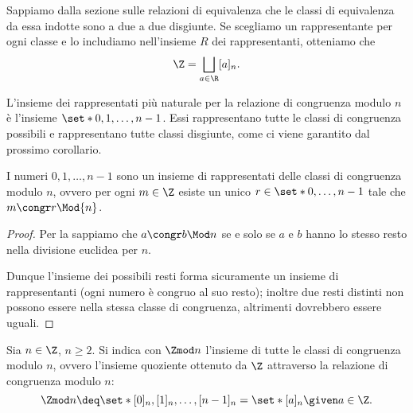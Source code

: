 Sappiamo dalla sezione sulle relazioni di equivalenza che le classi di equivalenza da essa indotte sono a due a due disgiunte. Se scegliamo un rappresentante per ogni classe e lo includiamo nell'insieme $R$ dei rappresentanti, otteniamo che \[
    \Z = \bigsqcup_{a \in \R} [a]_n. 
\]

L'insieme dei rappresentati più naturale per la relazione di congruenza modulo $n$ è l'insieme $\set*{0, 1, \dots, n-1}$. Essi rappresentano tutte le classi di congruenza possibili e rappresentano tutte classi disgiunte, come ci viene garantito dal prossimo corollario.

\begin{corollary}
    I numeri $0, 1, \dots, n-1$ sono un insieme di rappresentati delle classi di congruenza modulo $n$, ovvero per ogni $m \in \Z$ esiste un unico $r \in \set*{0, \dots, n-1}$ tale che $m \congr r \Mod{n}$.
\end{corollary}
\begin{proof}
    Per la  sappiamo che $a \congr b \Mod n$ se e solo se $a$ e $b$ hanno lo stesso resto nella divisione euclidea per $n$.

    Dunque l'insieme dei possibili resti forma sicuramente un insieme di rappresentanti (ogni numero è congruo al suo resto); inoltre due resti distinti non possono essere nella stessa classe di congruenza, altrimenti dovrebbero essere uguali.
\end{proof}

\begin{definition}
    Sia $n \in \Z$, $n \geq 2$. Si indica con $\Zmod n$ l'insieme di tutte le classi di congruenza modulo $n$, ovvero l'insieme quoziente ottenuto da $\Z$ attraverso la relazione di congruenza modulo $n$: \begin{equation}
        \Zmod n \deq \set*{[0]_n, [1]_n, \dots, [n-1]_n} = \set*{[a]_n \given a \in \Z}.
    \end{equation}
\end{definition}

